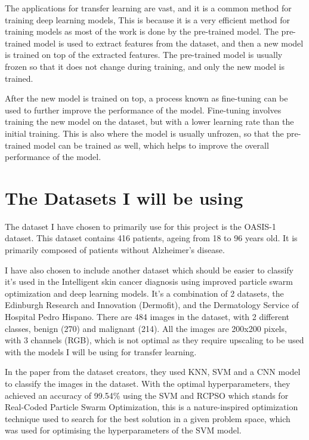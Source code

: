 \documentclass[]{final_report}
\begin{document}
The applications for transfer learning are vast, and it is a common method for training deep learning models,
This is because it is a very efficient method for training models as most of the work is done by the pre-trained model.
The pre-trained model is used to extract features from the dataset, and then a new model is trained on top of the extracted features.
The pre-trained model is usually frozen so that it does not change during training, and only the new model is trained.

After the new model is trained on top, a process known as fine-tuning can be used to further improve the performance of the model.
Fine-tuning involves training the new model on the dataset, but with a lower learning rate than the initial training.
This is also where the model is usually unfrozen, so that the pre-trained model can be trained as well, which helps to improve the overall performance of the model.

\chapter{The Datasets I will be using}
The dataset I have chosen to primarily use for this project is the OASIS-1\cite{OASIS} dataset.
This dataset contains 416 patients, ageing from 18 to 96 years old. It is primarily composed of patients without Alzheimer's disease.

I have also chosen to include another dataset which should be easier to classify it's used in the Intelligent skin cancer diagnosis using improved particle swarm optimization and deep learning models\cite{TAN2019105725}.
It's a combination of 2 datasets, the Edinburgh Research and Innovation (Dermofit)\cite{Ballerini2013}, and the Dermatology Service of Hospital Pedro Hispano\cite{6610779}. There are 484 images in the dataset, with 2 different classes, benign (270) and malignant (214). All the images are 200x200 pixels, with 3 channels (RGB), which is not optimal as they require upscaling to be used with the models I will be using for transfer learning.

In the paper from the dataset creators, they used KNN, SVM and a CNN model to classify the images in the dataset.
With the optimal hyperparameters, they achieved an accuracy of 99.54\% using the SVM and RCPSO which stands for Real-Coded Particle Swarm Optimization, this is a nature-inspired optimization technique used to search for the best solution in a given problem space, which was used for optimising the hyperparameters of the SVM model.
\end{document}
